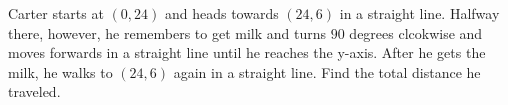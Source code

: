 Carter starts at $(0,24)$ and heads towards $(24,6)$ in a straight line. Halfway there, however, he remembers to get milk and turns $90$ degrees clcokwise and moves forwards in a straight line until he reaches the y-axis. After he gets the milk, he walks to $(24,6)$ again in a straight line. Find the total distance he traveled.

